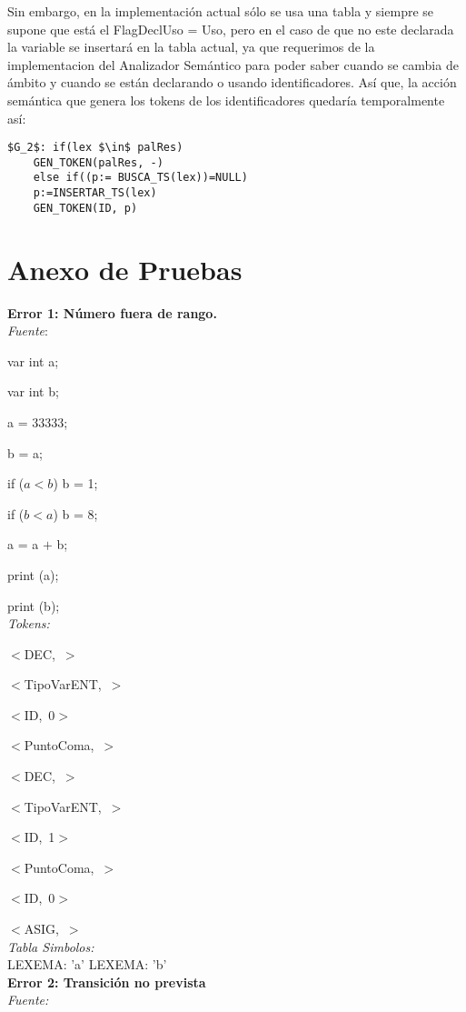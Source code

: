\documentclass[a4paper, 12pt]{article}
\begin{document}
Sin embargo, en la implementación actual sólo se usa una tabla y siempre se supone que está el FlagDeclUso = Uso, pero en el caso de que no este declarada la variable se insertará en la tabla actual, ya que requerimos de la implementacion del Analizador Semántico para poder saber cuando se cambia de ámbito y cuando se están declarando o usando identificadores. Así que, la acción semántica que genera los tokens de los identificadores quedaría temporalmente así:
\begin{lstlisting}
$G_2$: if(lex $\in$ palRes)
	GEN_TOKEN(palRes, -)
    else if((p:= BUSCA_TS(lex))=NULL)
	p:=INSERTAR_TS(lex)
	GEN_TOKEN(ID, p)
\end{lstlisting}

\section{Anexo de Pruebas}

\textbf{Error 1: Número fuera de rango.} \\ 
\emph{Fuente}:


var int a;


var int b;


a = 33333;


b = a;


 if ($a  <  b$) b  =  1; 
 
 
if ($b  <  a$) b  =  8;


 a = a  $+$  b;
 
 
print (a);


print (b);\medskip\\
\emph{Tokens:}


\mbox{$<$DEC, $>$}


\mbox{$<$TipoVarENT, $>$}


\mbox{$<$ID, 0$>$}


\mbox{$<$PuntoComa, $>$}


\mbox{$<$DEC, $>$}


\mbox{$<$TipoVarENT, $>$}


\mbox{$<$ID, 1$>$}


\mbox{$<$PuntoComa, $>$}


\mbox{$<$ID, 0$>$}


\mbox{$<$ASIG, $>$}\medskip\\
\emph{Tabla Simbolos:}\\
  LEXEMA: 'a'
  LEXEMA: 'b'\bigskip \\
\textbf{Error 2: Transición no prevista}\medskip\\
\emph{Fuente:} 
\end{document}
